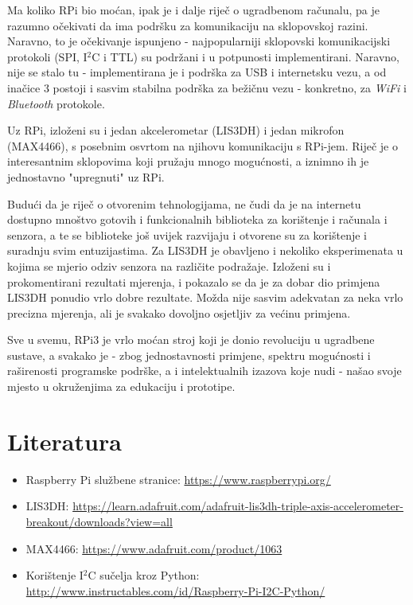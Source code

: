 \documentclass[12pt,a4paper]{article}
\begin{document}
	\par Ma koliko RPi bio moćan, ipak je i dalje riječ o ugradbenom računalu, pa je razumno očekivati da ima podršku za komunikaciju na sklopovskoj razini. Naravno, to je očekivanje ispunjeno - najpopularniji sklopovski komunikacijski protokoli (SPI, I$^2$C i TTL) su podržani i u potpunosti implementirani. Naravno, nije se stalo tu - implementirana je i podrška za USB i internetsku vezu, a od inačice 3 postoji i sasvim stabilna podrška za bežičnu vezu - konkretno, za \textit{WiFi} i \textit{Bluetooth} protokole. \\

	\par Uz RPi, izloženi su i jedan akcelerometar (LIS3DH) i jedan mikrofon (MAX4466), s posebnim osvrtom na njihovu komunikaciju s RPi-jem. Riječ je o interesantnim sklopovima koji pružaju mnogo mogućnosti, a iznimno ih je jednostavno "upregnuti" uz RPi. \\

	\par Budući da je riječ o otvorenim tehnologijama, ne čudi da je na internetu dostupno mnoštvo gotovih i funkcionalnih biblioteka za korištenje i računala i senzora, a te se biblioteke još uvijek razvijaju i otvorene su za korištenje i suradnju svim entuzijastima. Za LIS3DH je obavljeno i nekoliko eksperimenata u kojima se mjerio odziv senzora na različite podražaje. Izloženi su i prokomentirani rezultati mjerenja, i pokazalo se da je za dobar dio primjena LIS3DH ponudio vrlo dobre rezultate. Možda nije sasvim adekvatan za neka vrlo precizna mjerenja, ali je svakako dovoljno osjetljiv za većinu primjena. \\

	\par Sve u svemu, RPi3 je vrlo moćan stroj koji je donio revoluciju u ugradbene sustave, a svakako je - zbog jednostavnosti primjene, spektru mogućnosti i raširenosti programske podrške, a i intelektualnih izazova koje nudi - našao svoje mjesto u okruženjima za edukaciju i prototipe.


\newpage
\section{Literatura}

\begin{itemize}
	\item Raspberry Pi službene stranice: \url{https://www.raspberrypi.org/}
	\item LIS3DH: \url{https://learn.adafruit.com/adafruit-lis3dh-triple-axis-accelerometer-breakout/downloads?view=all}
	\item MAX4466: \url{https://www.adafruit.com/product/1063}
	\item Korištenje I$^2$C sučelja kroz Python: \url{http://www.instructables.com/id/Raspberry-Pi-I2C-Python/}
\end{itemize}
\end{document}
